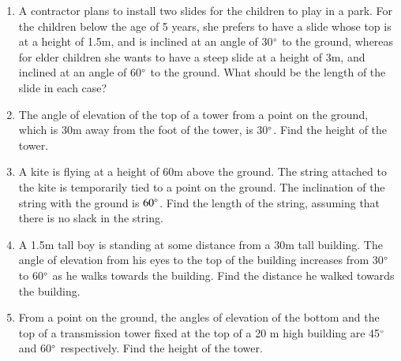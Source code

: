 \begin{enumerate}[label=\arabic*.,ref=\thesubsection.\theenumi]
%
\item A contractor plans to install two slides for the children to play in a park.  For the children below the age of 5 years, she prefers to have a slide whose top is at a height of 1.5m, and is inclined at an angle of 30$\degree$  to the ground, whereas for elder children she wants to have a steep slide at a height of 3m, and inclined at an angle of 60$\degree$ to the ground.  What should be the length of the slide in each case?
%
\item The angle of elevation of the top of a tower from a point on the ground, which is 30m away from the foot of the tower, is 30$\degree$.  Find the height of the tower.
%
\item A kite is flying at a height of 60m above the ground.  The string attached to the kite is temporarily tied to a point on the ground.  The inclination of the string with the ground is $60\degree$.  Find the length of the string, assuming that there is no slack in the string.
%
\item A 1.5m tall boy is standing at some distance from a 30m tall building.  The angle of elevation from his eyes to the top of the building increases from 30$\degree$
 to 60$\degree $ as he walks towards the building.  Find the distance he walked towards the building.

\item From a point on the ground, the angles of elevation of the bottom and the top of a transmission tower fixed at the top of a 20 m high building are 45$\degree$ and 60$\degree$ respectively. Find the height of the tower.


\end{enumerate}
